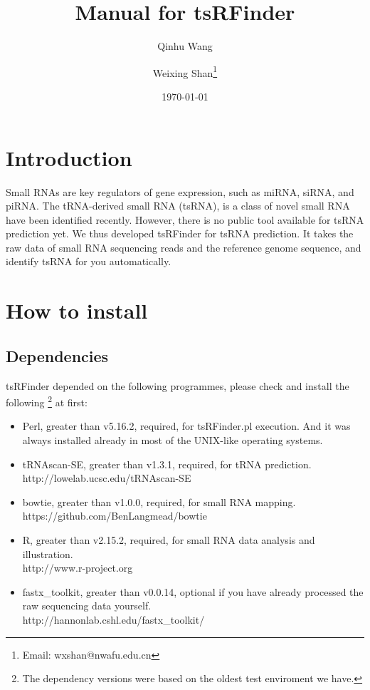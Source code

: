 \documentclass[11pt, a4paper]{article}
\title{Manual for tsRFinder}
\author{Qinhu Wang}
\author{Weixing Shan\thanks{Email: wxshan@nwafu.edu.cn}}
\affil{Northwest A\&F University}
\date{\today}
\begin{document}
\maketitle
\tableofcontents

\section{Introduction}

Small RNAs are key regulators of gene expression, such as miRNA, siRNA, and piRNA. The tRNA-derived small RNA (tsRNA), is a class of novel small RNA have been identified recently. However, there is no public tool available for tsRNA prediction yet. We thus developed tsRFinder for tsRNA prediction. It takes the raw data of small RNA sequencing reads and the reference genome sequence, and identify tsRNA for you automatically.

\section{How to install}

\subsection{Dependencies}

tsRFinder depended on the following programmes, please check and install the following \footnote{The dependency versions were based on the oldest test enviroment we have.} at first:


\begin{itemize}

\item Perl, greater than v5.16.2, required, for tsRFinder.pl execution. And it was always installed already in most of the UNIX-like operating systems.
\item tRNAscan-SE, greater than v1.3.1, required, for tRNA prediction. \\http://lowelab.ucsc.edu/tRNAscan-SE
\item bowtie, greater than v1.0.0, required, for small RNA mapping. \\https://github.com/BenLangmead/bowtie
\item R, greater than v2.15.2, required, for small RNA data analysis and illustration. \\http://www.r-project.org
\item fastx\_toolkit, greater than v0.0.14, optional if you have already processed the raw sequencing data yourself. \\http://hannonlab.cshl.edu/fastx\_toolkit/

\end{itemize}
\end{document}
